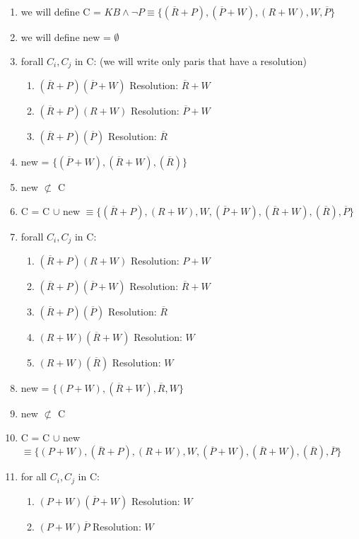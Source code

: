 \documentclass{article}
\begin{document}
\begin{enumerate}
    \item we will define C = $KB \land \neg P \equiv \{(\overline R + P),(\overline P + W),(R + W),W,\overline P\}$ 
    \item we will define new = $\emptyset$
    \item forall $C_i, C_j$ in C: (we will write only paris that have a resolution)
    \begin{enumerate}
        \item $(\overline R + P)(\overline P + W)$ Resolution: $\overline R + W$
        \item $(\overline R + P)(R + W)$ Resolution: $\overline P + W$
        \item $(\overline R + P)(\overline P)$ Resolution: $\overline R$
    \end{enumerate}
    \item new = $\{(\overline P + W ),(\overline R + W),(\overline R)\}$
    \item new $\not\subset$ C
    \item C = C $\cup$ new $\equiv \{(\overline R + P) , (R + W), W,(\overline P + W ),(\overline R + W),(\overline R), \overline P\}$
    \item forall $C_i, C_j$ in C:
    \begin{enumerate}
        \item $(\overline R + P)(R + W)$ Resolution: $P+W $
        \item $(\overline R + P)(\overline P + W)$ Resolution: $\overline R +W $
        \item $(\overline R + P)(\overline P) $ Resolution: $\overline R$
        \item $(R+W)(\overline R + W)$ Resolution: $W$
        \item $(R+W)(\overline R)$ Resolution: $W$
    \end{enumerate}
    \item new = $\{(P+W),(\overline R + W),\overline R ,W\}$
    \item new $\not\subset$ C
    \item C = C $\cup$ new $\equiv \{(P+W),(\overline R + P) , (R + W), W,(\overline P + W ),(\overline R + W),(\overline R), \overline P\}$
    \item for all $C_i, C_j$ in C:
    \begin{enumerate}
        \item $(P+W)(\overline P + W)$ Resolution: $W$
        \item $(P+W)\overline P$ Resolution: $W$

\end{enumerate}
\end{enumerate}
\end{document}
